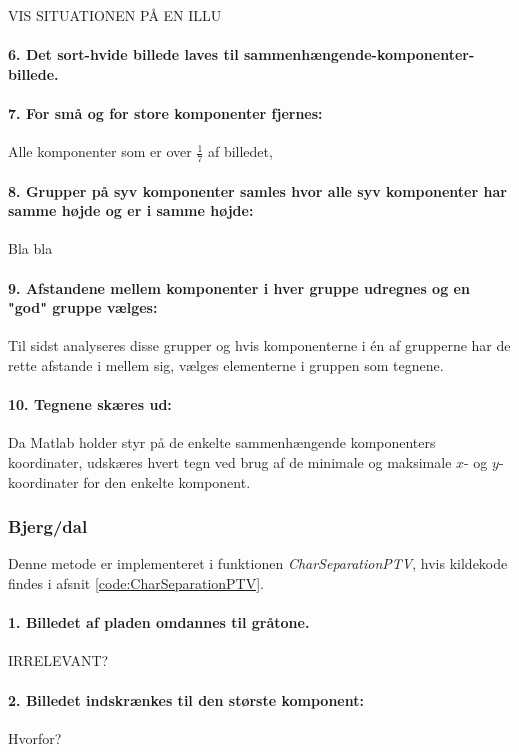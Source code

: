 VIS SITUATIONEN PÅ EN ILLU
\paragraph{6. Det sort-hvide billede laves til sammenhængende-komponenter-billede.}
\paragraph{7. For små og for store komponenter fjernes:} Alle komponenter som er over $\frac{1}{7}$ af billedet, 

\paragraph{8. Grupper på syv komponenter samles hvor alle syv komponenter har samme højde og er i samme højde:} Bla bla

\paragraph{9. Afstandene mellem komponenter i hver gruppe udregnes og en "god" gruppe vælges:}
Til sidst analyseres disse grupper og hvis komponenterne i én af grupperne har de rette afstande i mellem sig, vælges elementerne i gruppen som tegnene.

\paragraph{10. Tegnene skæres ud:} Da Matlab holder styr på de enkelte sammenhængende komponenters koordinater, udskæres hvert tegn ved brug af de minimale og maksimale $x$- og $y$-koordinater for den enkelte komponent.

\subsubsection*{Bjerg/dal}

Denne metode er implementeret i funktionen \textit{CharSeparationPTV}, hvis kildekode findes i afsnit \vref{code:CharSeparationPTV}.

\paragraph{1. Billedet af pladen omdannes til gråtone.} IRRELEVANT?

\paragraph{2. Billedet indskrænkes til den største komponent:}
Hvorfor?

